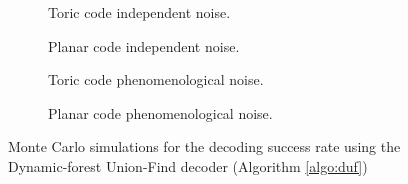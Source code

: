 \begin{figure}[htbp]
  \centering
  \begin{subfigure}[b]{0.49\textwidth}
      \begin{adjustbox}{Clip=0 1em 0 0}
        
      \end{adjustbox}
      \caption{Toric code independent noise.}
  \end{subfigure}
  \begin{subfigure}[b]{0.49\textwidth}
      \begin{adjustbox}{Clip=0 1em 0 0}
        
      \end{adjustbox}
      \caption{Planar code independent noise.}
  \end{subfigure}
  \begin{subfigure}[b]{0.49\textwidth}
      \begin{adjustbox}{Clip=0 1em 0 0}
        
      \end{adjustbox}
      \caption{Toric code phenomenological noise.}
  \end{subfigure}
  \begin{subfigure}[b]{0.49\textwidth}
      \begin{adjustbox}{Clip=0 1em 0 0}
        
      \end{adjustbox}
      \caption{Planar code phenomenological noise.}
  \end{subfigure}
  \caption{Monte Carlo simulations for the decoding success rate using the Dynamic-forest Union-Find decoder (Algorithm \ref{algo:duf})}
  \label{fig:threshold_duf}
\end{figure}

